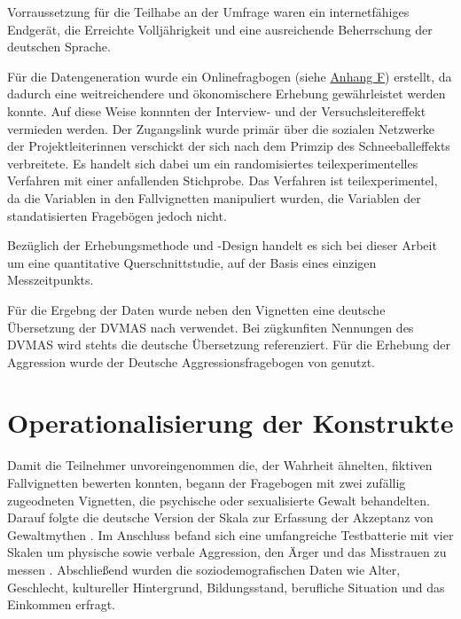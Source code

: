 Vorraussetzung für die Teilhabe an der Umfrage waren ein internetfähiges Endgerät, die Erreichte Volljährigkeit und eine ausreichende Beherrschung der deutschen Sprache. 

Für die Datengeneration wurde ein Onlinefragbogen (siehe \hyperref[Fragebogen]{Anhang F}) erstellt, da dadurch eine weitreichendere und ökonomischere Erhebung gewährleistet werden konnte. Auf diese Weise konnnten der Interview- und der Versuchsleitereffekt vermieden werden. Der Zugangslink wurde primär über die sozialen Netzwerke der Projektleiterinnen verschickt der sich nach dem Primzip des Schneeballeffekts verbreitete. Es handelt sich dabei um ein randomisiertes teilexperimentelles Verfahren mit einer anfallenden Stichprobe. Das Verfahren ist teilexperimentel, da die Variablen in den Fallvignetten manipuliert wurden, die Variablen der standatisierten Fragebögen jedoch nicht.

Bezüglich der Erhebungsmethode und -Design handelt es sich bei dieser Arbeit um eine quantitative Querschnittstudie, auf der Basis eines einzigen Messzeitpunkts.

Für die Ergebng der Daten wurde neben den Vignetten eine deutsche Übersetzung der DVMAS nach \textcite{Peters2003} verwendet. Bei zügkunfiten Nennungen des DVMAS wird stehts die deutsche Übersetzung referenziert. Für die Erhebung der Aggression wurde der Deutsche Aggressionsfragebogen von \textcite{Aggressionsfragebogen} genutzt.


\section{Operationalisierung der Konstrukte}    \label{sec_3.3}
Damit die Teilnehmer unvoreingenommen die, der Wahrheit ähnelten, fiktiven Fallvignetten bewerten konnten, begann der Fragebogen mit zwei zufällig zugeodneten Vignetten, die psychische oder sexualisierte Gewalt behandelten. Darauf folgte die deutsche Version der Skala zur Erfassung der Akzeptanz von Gewaltmythen \parencite{Peters2003}. Im Anschluss befand sich eine umfangreiche Testbatterie mit vier Skalen um physische sowie verbale Aggression, den Ärger und das Misstrauen zu messen \parencite{Aggressionsfragebogen}. Abschließend wurden die soziodemografischen Daten wie Alter, Geschlecht, kultureller Hintergrund, Bildungsstand, berufliche Situation und das Einkommen erfragt.

